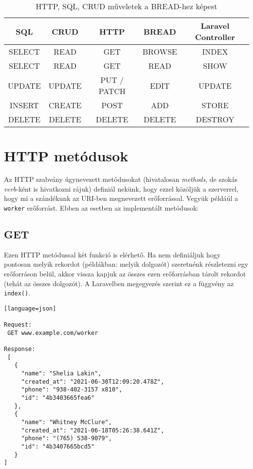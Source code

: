 \documentclass[a4paper,12pt]{thesis-ekf}
\theoremstyle{definition}
\begin{document}
			\begin{table}[h!]
				\centering
				\begin{tabular}{|c|c|c|c|c|}
					\hline
					\textbf{SQL} & \textbf{CRUD} & \textbf{HTTP} & \textbf{BREAD} &\textbf{Laravel Controller} \\ \hline
					SELECT & READ & GET & BROWSE & INDEX \\ \hline
					SELECT & READ & GET & READ & SHOW \\ \hline
					UPDATE & UPDATE & PUT / PATCH & EDIT & UPDATE \\ \hline
					INSERT & CREATE & POST & ADD & STORE \\ \hline
					DELETE & DELETE & DELETE & DELETE & DESTROY \\ \hline
				\end{tabular}
				\caption{HTTP, SQL, CRUD műveletek a BREAD-hez képest}
				\label{table:http-sql-crud-bread}
			\end{table}	
		
		\section{HTTP metódusok}
			Az HTTP szabvány úgynevezett metódusokat (hivatalosan \emph{methods}, de szokás \emph{verb}-ként is hivatkozni rájuk) definiál nekünk, hogy ezzel közöljük a szerverrel, hogy mi a szándékunk az URI-ben megnevezett erőforrással. Vegyük példáúl a \verb|worker| erőforrást. Ebben az esetben az implementált metódusok:
		
			\subsection{GET}
				Ezen HTTP metódussal két funkció is elérhető. Ha nem definiáljuk hogy pontosan melyik rekordot (példákban: melyik dolgozót) szeretnénk részletezni egy erőforráson belül, akkor vissza kapjuk az összes ezen erőforrásban tárolt rekordot (tehát az összes dolgozót). A Laravelben megegyezés szerint ez a függvény az \verb|index()|.
\begin{lstlisting}[caption={Példa a BROWSE metódusra}][language=json]

Request:
 GET www.example.com/worker
 
Response:
 [
   {
     "name": "Shelia Lakin",
     "created_at": "2021-06-30T12:09:20.478Z",
     "phone": "938-402-3157 x810",
     "id": "4b3403665fea6"
   },
   {
     "name": "Whitney McClure",
     "created_at": "2021-06-18T05:26:38.641Z",
     "phone": "(765) 538-9079",
     "id": "4b3407665bcd5"
   }
]
\end{lstlisting}
				
\end{document}
